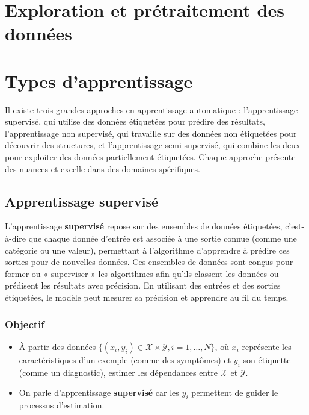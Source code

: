 \documentclass[a4paper,12pt]{report}
\begin{document}
    \section{Exploration et prétraitement des données }

    \section{Types d’apprentissage}
    
        Il existe trois grandes approches en apprentissage automatique : l'apprentissage supervisé, qui utilise des données étiquetées pour prédire des résultats, l'apprentissage non supervisé, qui travaille sur des données non étiquetées pour découvrir des structures, et l'apprentissage semi-supervisé, qui combine les deux pour exploiter des données partiellement étiquetées. Chaque approche présente des nuances et excelle dans des domaines spécifiques.
        
        \subsection{Apprentissage supervisé}
        
        L'apprentissage \textbf{supervisé} repose sur des ensembles de données étiquetées, c’est-à-dire que chaque donnée d’entrée est associée à une sortie connue (comme une catégorie ou une valeur), permettant à l’algorithme d’apprendre à prédire ces sorties pour de nouvelles données. Ces ensembles de données sont conçus pour former ou « superviser » les algorithmes afin qu'ils classent les données ou prédisent les résultats avec précision. En utilisant des entrées et des sorties étiquetées, le modèle peut mesurer sa précision et apprendre au fil du temps.
        
        \subsubsection*{Objectif}
        
        \begin{itemize}
            \item  À partir des données \(\{(x_i, y_i) \in \mathcal{X} \times \mathcal{Y}, i = 1, \ldots, N\}\), où \(x_i\) représente les caractéristiques d’un exemple (comme des symptômes) et \(y_i\) son étiquette (comme un diagnostic), estimer les dépendances entre \(\mathcal{X}\) et \(\mathcal{Y}\).
            \item  On parle d'apprentissage \textbf{supervisé} car les \(y_i\) permettent de guider le processus d’estimation.
        \end{itemize}
        
\end{document}
